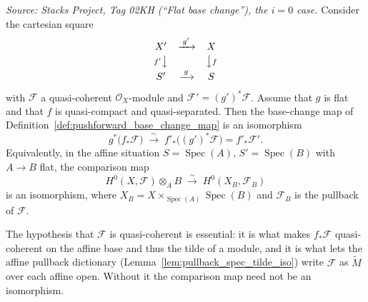 \begin{theorem}\leanok
[Flat base change, $i=0$ case]
  \label{thm:flat_base_change_pushforward}
  \textit{Source: Stacks Project, Tag 02KH (``Flat base change''), the
  \(i = 0\) case.}
  Consider the cartesian square
  \[
    \begin{array}{ccc}
      X' & \xrightarrow{\;g'\;} & X \\[2pt]
      {\scriptstyle f'}\big\downarrow & & \big\downarrow{\scriptstyle f} \\[2pt]
      S' & \xrightarrow{\;g\;} & S
    \end{array}
  \]
  with \(\mathcal{F}\) a quasi-coherent \(\mathcal{O}_X\)-module and
  \(\mathcal{F}' = (g')^*\mathcal{F}\). Assume that \(g\) is flat and that \(f\)
  is quasi-compact and quasi-separated. Then the base-change map of
  Definition~\ref{def:pushforward_base_change_map} is an isomorphism
  \[
    g^*\bigl(f_*\mathcal{F}\bigr) \;\xrightarrow{\;\sim\;}\;
    f'_*\bigl((g')^*\mathcal{F}\bigr) = f'_*\mathcal{F}' .
  \]
  Equivalently, in the affine situation \(S = \operatorname{Spec}(A)\),
  \(S' = \operatorname{Spec}(B)\) with \(A \to B\) flat, the comparison map
  \[
    H^0(X, \mathcal{F}) \otimes_A B \;\xrightarrow{\;\sim\;}\;
    H^0(X_B, \mathcal{F}_B)
  \]
  is an isomorphism, where \(X_B = X \times_{\operatorname{Spec}(A)}
  \operatorname{Spec}(B)\) and \(\mathcal{F}_B\) is the pullback of
  \(\mathcal{F}\).

  The hypothesis that \(\mathcal{F}\) is quasi-coherent is essential: it is what
  makes \(f_*\mathcal{F}\) quasi-coherent on the affine base and thus the tilde of
  a module, and it is what lets the affine pullback dictionary
  (Lemma~\ref{lem:pullback_spec_tilde_iso}) write \(\mathcal{F}\) as
  \(\widetilde{M}\) over each affine open. Without it the comparison map need not be
  an isomorphism.
\end{theorem}

